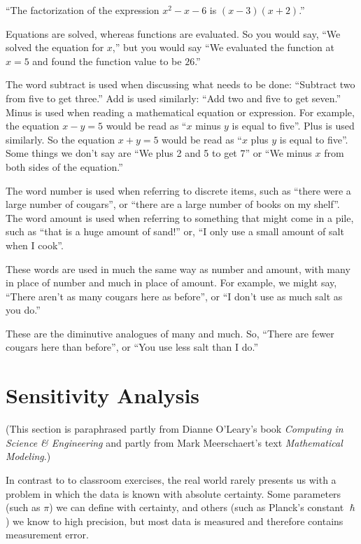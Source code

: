 \documentclass[
]{book}
\theoremstyle{definition}
\theoremstyle{definition}
\theoremstyle{definition}
\theoremstyle{remark}
\begin{document}
\begin{description}
``The factorization of the expression \(x^2 - x - 6\) is
\((x - 3)(x + 2)\).''
\item[Solve/Evaluate:]
Equations are solved, whereas functions are evaluated. So you would
say, ``We solved the equation for \(x\),'' but you would say ``We
evaluated the function at \(x = 5\) and found the function value to be
\(26\).''
\item[Add Subtract vs Plus Minus:]
The word subtract is used when discussing what needs to be done:
``Subtract two from five to get three.'' Add is used similarly: ``Add
two and five to get seven.'' Minus is used when reading a
mathematical equation or expression. For example, the equation
\(x - y = 5\) would be read as ``\(x\) minus \(y\) is equal to five''. Plus
is used similarly. So the equation \(x + y  = 5\) would be read as ``\(x\) plus \(y\) is equal to five''. Some
things we don't say are ``We plus 2 and 5 to get 7'' or ``We minus \(x\)
from both sides of the equation.''
\item[Number/Amount:]
The word number is used when referring to discrete items, such as
``there were a large number of cougars'', or ``there are a large number
of books on my shelf''. The word amount is used when referring to
something that might come in a pile, such as ``that is a huge amount
of sand!'' or, ``I only use a small amount of salt when I cook''.
\item[Many/Much:]
These words are used in much the same way as number and amount, with
many in place of number and much in place of amount. For example, we
might say, ``There aren't as many cougars here as before'', or ``I
don't use as much salt as you do.''
\item[Fewer/Less:]
These are the diminutive analogues of many and much. So, ``There are
fewer cougars here than before'', or ``You use less salt than I do.''
\end{description}

\hypertarget{sensitivity-analysis}{%
\section{Sensitivity Analysis}\label{sensitivity-analysis}}

(This section is paraphrased partly from Dianne O'Leary's book
\emph{Computing in Science \& Engineering} and partly from Mark Meerschaert's
text \emph{Mathematical Modeling}.)

In contrast to to classroom exercises, the real world rarely presents us
with a problem in which the data is known with absolute certainty. Some
parameters (such as \(\pi\)) we can define with certainty, and others
(such as Planck's constant \(\hslash\)) we know to high precision, but
most data is measured and therefore contains measurement error.
\end{document}
